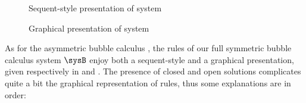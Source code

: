 %   

\begin{figure*}
  
  \caption{Sequent-style presentation of system }
\end{figure*}

\begin{figure*}
  
  \caption{Graphical presentation of system }
\end{figure*}

As for the asymmetric bubble calculus , the rules of our full symmetric
bubble calculus system $\sysB$ enjoy both a sequent-style and a graphical
presentation, given respectively in  and .
The presence of closed and open solutions complicates quite a bit the graphical
representation of rules, thus some explanations are in order:
